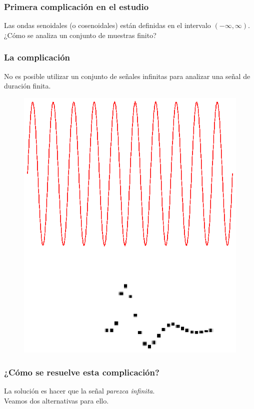 \documentclass[12pt]{beamer}
\begin{document}
\begin{frame}
\frametitle{Primera complicación en el estudio}
Las ondas senoidales (o cosenoidales) están definidas en el intervalo $(-\infty, \infty)$.
\\
\bigskip
\pause
¿Cómo se analiza un conjunto de muestras finito?
\end{frame}
\begin{frame}
\frametitle{La complicación}
No es posible utilizar un conjunto de señales infinitas para analizar una señal de duración finita.
\begin{figure}
    \centering
    \includegraphics[scale=0.6]{Imagenes/Transformada_Discreta_02.eps}
\end{figure}
\end{frame}
\begin{frame}
\frametitle{¿Cómo se resuelve esta complicación?}
La solución es hacer que la señal \emph{parezca infinita}.
\\
\bigskip
\pause
Veamos dos alternativas para ello.
\end{frame}
\end{document}
